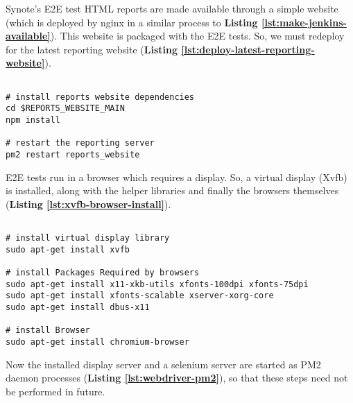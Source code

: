 Synote's E2E test HTML reports are made available through a simple website (which is deployed by nginx in a similar process to \textbf{Listing \ref{lst:make-jenkins-available}}). This website is packaged with the E2E tests. So, we must redeploy for the latest reporting website (\textbf{Listing \ref{lst:deploy-latest-reporting-website}}).\\

\begin{listing}[H]
\begin{verbatim}

# install reports website dependencies
cd $REPORTS_WEBSITE_MAIN
npm install

# restart the reporting server
pm2 restart reports_website

\end{verbatim}
\label{lst:deploy-latest-reporting-website}
\end{listing}

E2E tests run in a browser which requires a display. So, a virtual display (Xvfb) is installed, along with the helper libraries and finally the browsers themselves (\textbf{Listing \ref{lst:xvfb-browser-install}}).\\

\begin{listing}[H]
\begin{verbatim}

# install virtual display library
sudo apt-get install xvfb

# install Packages Required by browsers
sudo apt-get install x11-xkb-utils xfonts-100dpi xfonts-75dpi
sudo apt-get install xfonts-scalable xserver-xorg-core
sudo apt-get install dbus-x11

# install Browser
sudo apt-get install chromium-browser

\end{verbatim}
\label{lst:xvfb-browser-install}
\end{listing}

Now the installed display server and a selenium server are started as PM2 daemon processes  (\textbf{Listing \ref{lst:webdriver-pm2}}), so that these steps need not be performed in future.\\

